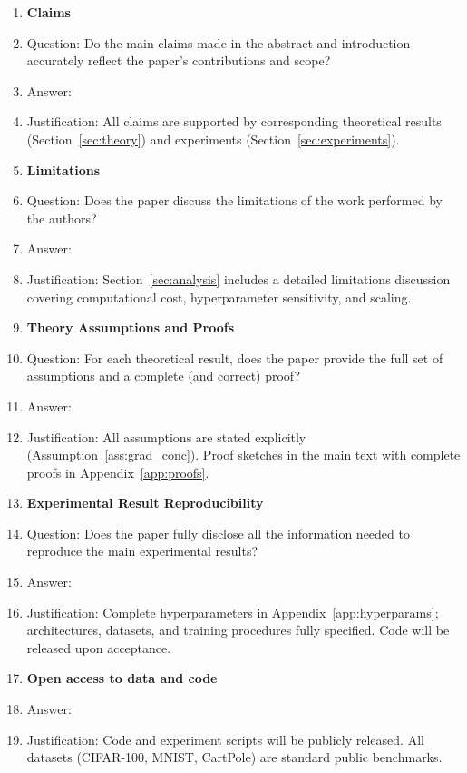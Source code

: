 \documentclass{article}
\begin{document}
\begin{enumerate}

\item {\bf Claims}
    \item[] Question: Do the main claims made in the abstract and introduction accurately reflect the paper's contributions and scope?
    \item[] Answer: \answerYes{}
    \item[] Justification: All claims are supported by corresponding theoretical results (Section~\ref{sec:theory}) and experiments (Section~\ref{sec:experiments}).

\item {\bf Limitations}
    \item[] Question: Does the paper discuss the limitations of the work performed by the authors?
    \item[] Answer: \answerYes{}
    \item[] Justification: Section~\ref{sec:analysis} includes a detailed limitations discussion covering computational cost, hyperparameter sensitivity, and scaling.

\item {\bf Theory Assumptions and Proofs}
    \item[] Question: For each theoretical result, does the paper provide the full set of assumptions and a complete (and correct) proof?
    \item[] Answer: \answerYes{}
    \item[] Justification: All assumptions are stated explicitly (Assumption~\ref{ass:grad_conc}). Proof sketches in the main text with complete proofs in Appendix~\ref{app:proofs}.

\item {\bf Experimental Result Reproducibility}
    \item[] Question: Does the paper fully disclose all the information needed to reproduce the main experimental results?
    \item[] Answer: \answerYes{}
    \item[] Justification: Complete hyperparameters in Appendix~\ref{app:hyperparams}; architectures, datasets, and training procedures fully specified. Code will be released upon acceptance.

\item {\bf Open access to data and code}
    \item[] Answer: \answerYes{}
    \item[] Justification: Code and experiment scripts will be publicly released. All datasets (CIFAR-100, MNIST, CartPole) are standard public benchmarks.


\end{enumerate}
\end{document}
